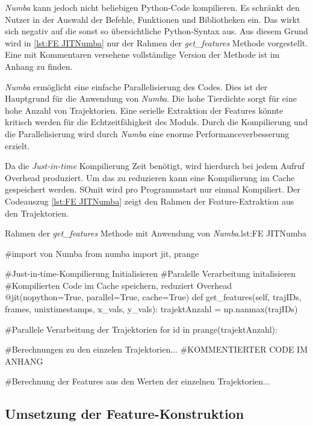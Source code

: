 \textit{Numba} kann jedoch nicht beliebigen Python-Code kompilieren. Es schränkt den Nutzer in der Auswahl der Befehle, Funktionen und Bibliotheken ein. Das wirkt sich negativ auf die sonst so übersichtliche Python-Syntax aus. Aus diesem Grund wird in \ref{lst:FE JITNumba} nur der Rahmen der \textit{get\_features} Methode vorgestellt. Eine mit Kommentaren versehene vollständige Version der Methode ist im Anhang zu finden. \par

\textit{Numba} ermöglicht eine einfache Parallelisierung des Codes. Dies ist der Hauptgrund für die Anwendung von \textit{Numba}. Die hohe Tierdichte sorgt für eine hohe Anzahl von Trajektorien. Eine serielle Extraktion der Features könnte kritisch werden für die Echtzeitfähigkeit des Moduls. Durch die Kompilierung und die Parallelisierung wird durch \textit{Numba} eine enorme Performanceverbesserung erzielt.\par

Da die \textit{Just-in-time} Kompilierung Zeit benötigt, wird hierdurch bei jedem Aufruf \gls{Overhead} produziert. Um das zu reduzieren kann eine Kompilierung im Cache gespeichert werden. SOmit wird pro Programmstart nur einmal Kompiliert. Der Codeauszug \ref{lst:FE JITNumba} zeigt den Rahmen der Feature-Extraktion aus den Trajektorien.

\begin{pythoncode}{Rahmen der \textit{get\_features} Methode mit Anwendung von \textit{Numba}.}{lst:FE JITNumba}

#import von Numba
from numba import jit, prange

#Just-in-time-Kompilierung Initialisieren
#Paralelle Verarbeitung initalisieren 
#Kompilierten Code im Cache speichern, reduziert Overhead
@jit(nopython=True, parallel=True, cache=True)
def get_features(self, trajIDs, frames, unixtimestamps, x_vals, y_vals):
    trajektAnzahl = np.nanmax(trajIDs)

    #Parallele Verarbeitung der Trajektorien 
    for id in prange(trajektAnzahl):

        #Berechnungen zu den einzelen Trajektorien...
        #KOMMENTIERTER CODE IM ANHANG

    #Berechnung der Features aus den Werten der einzelnen Trajektorien...

\end{pythoncode}


\subsection{Umsetzung der Feature-Konstruktion}

